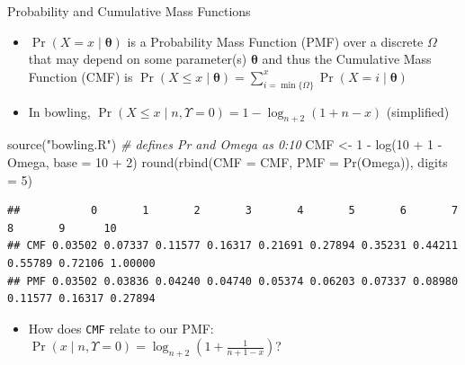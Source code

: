 \documentclass[
  ignorenonframetext,
]{beamer}
\newenvironment{Shaded}{\begin{snugshade}}{\end{snugshade}}
\newcommand{\AttributeTok}[1]{\textcolor[rgb]{0.77,0.63,0.00}{#1}}
\newcommand{\CommentTok}[1]{\textcolor[rgb]{0.56,0.35,0.01}{\textit{#1}}}
\newcommand{\DecValTok}[1]{\textcolor[rgb]{0.00,0.00,0.81}{#1}}
\newcommand{\FunctionTok}[1]{\textcolor[rgb]{0.00,0.00,0.00}{#1}}
\newcommand{\NormalTok}[1]{#1}
\newcommand{\OtherTok}[1]{\textcolor[rgb]{0.56,0.35,0.01}{#1}}
\newcommand{\SpecialCharTok}[1]{\textcolor[rgb]{0.00,0.00,0.00}{#1}}
\newcommand{\StringTok}[1]{\textcolor[rgb]{0.31,0.60,0.02}{#1}}
\providecommand{\tightlist}{%
  \setlength{\itemsep}{0pt}\setlength{\parskip}{0pt}}
\begin{document}
\begin{frame}[fragile]{Probability and Cumulative Mass Functions}
\protect\hypertarget{probability-and-cumulative-mass-functions}{}
\begin{itemize}
\tightlist
\item
  \(\Pr\left(X = x \mid \boldsymbol{\theta}\right)\) is a Probability
  Mass Function (PMF) over a discrete \(\Omega\) that may depend on some
  parameter(s) \(\boldsymbol{\theta}\) and thus the Cumulative Mass
  Function (CMF) is
  \(\Pr\left(X\leq x \mid \boldsymbol{\theta}\right)=\sum\limits_{i = \min\{\Omega\} }^x\Pr\left(X = i \mid \boldsymbol{\theta}\right)\)
\item
  In bowling,
  \(\Pr\left(X\leq x \mid n, \Upsilon = 0\right) = 1 - \log_{n + 2}\left(1 + n - x\right)\)
  (simplified)
\end{itemize}

\begin{Shaded}
\begin{Highlighting}[]
\FunctionTok{source}\NormalTok{(}\StringTok{"bowling.R"}\NormalTok{) }\CommentTok{\# defines Pr and Omega as 0:10}
\NormalTok{CMF }\OtherTok{\textless{}{-}} \DecValTok{1} \SpecialCharTok{{-}} \FunctionTok{log}\NormalTok{(}\DecValTok{10} \SpecialCharTok{+} \DecValTok{1} \SpecialCharTok{{-}}\NormalTok{ Omega, }\AttributeTok{base =} \DecValTok{10} \SpecialCharTok{+} \DecValTok{2}\NormalTok{)}
\FunctionTok{round}\NormalTok{(}\FunctionTok{rbind}\NormalTok{(}\AttributeTok{CMF =}\NormalTok{ CMF, }\AttributeTok{PMF =} \FunctionTok{Pr}\NormalTok{(Omega)), }\AttributeTok{digits =} \DecValTok{5}\NormalTok{)}
\end{Highlighting}
\end{Shaded}

\begin{verbatim}
##           0       1       2       3       4       5       6       7       8       9      10
## CMF 0.03502 0.07337 0.11577 0.16317 0.21691 0.27894 0.35231 0.44211 0.55789 0.72106 1.00000
## PMF 0.03502 0.03836 0.04240 0.04740 0.05374 0.06203 0.07337 0.08980 0.11577 0.16317 0.27894
\end{verbatim}

\begin{itemize}
\tightlist
\item
  How does \texttt{CMF} relate to our PMF:
  \(\Pr\left(x \mid n, \Upsilon = 0\right) = \log_{n + 2}\left(1 + \frac{1}{n + 1 - x}\right)\)?
\end{itemize}
\end{frame}
\end{document}
